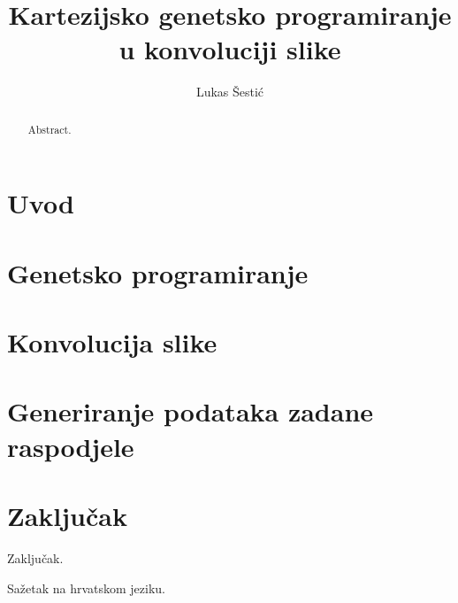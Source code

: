 \documentclass[times, utf8, diplomski]{fer}
\begin{document}
\title{Kartezijsko genetsko programiranje u konvoluciji slike}
\author{Lukas Šestić}

\maketitle

\izvornik

\zahvala{}

\tableofcontents

\chapter{Uvod}


\chapter{Genetsko programiranje}


\chapter{Konvolucija slike}


\chapter{Generiranje podataka zadane raspodjele}


\chapter{Zaključak}
Zaključak.




\begin{sazetak}
Sažetak na hrvatskom jeziku.

\end{sazetak}

\begin{abstract}
Abstract.

\end{abstract}
\end{document}
